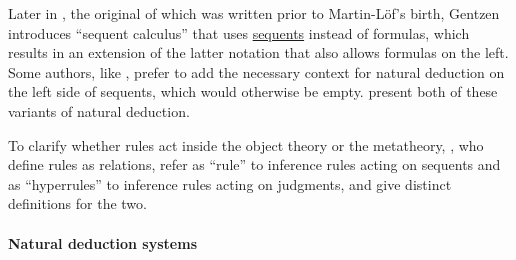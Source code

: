 \begin{remark}
  Later in \cite{Szabo1964Gentzen}, the original of which was written prior to Martin-L\"of's birth, Gentzen introduces \enquote{sequent calculus} that uses \hyperref[def:sequent]{sequents} instead of formulas, which results in an extension of the latter notation that also allows formulas on the left. Some authors, like , prefer to add the necessary context for natural deduction on the left side of sequents, which would otherwise be empty.  present both of these variants of natural deduction.

  To clarify whether rules act inside the object theory or the metatheory, , who define rules as relations, refer as \enquote{rule} to inference rules acting on sequents and as \enquote{hyperrules} to inference rules acting on judgments, and give distinct definitions for the two.
\end{remark}

\paragraph{Natural deduction systems}

